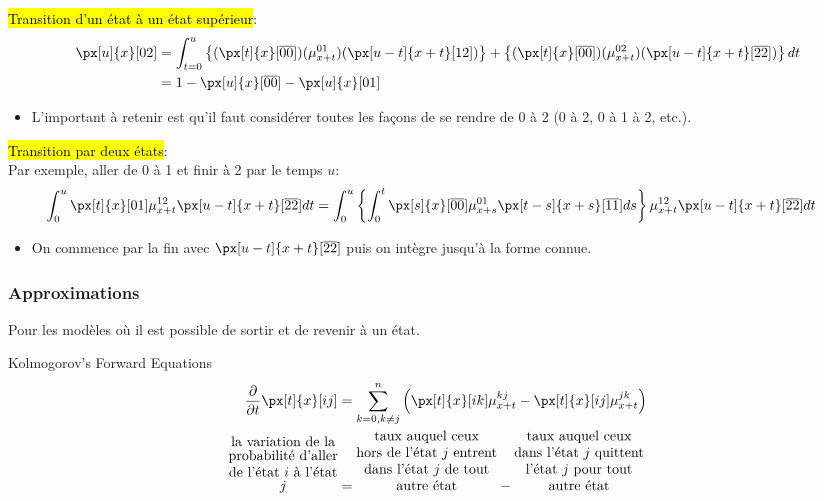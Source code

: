 \documentclass[10pt, french]{article}
\begin{document}
\begin{multicols*}{2}
\hl{Transition d'un état à un état supérieur}:
\begin{align*}
	\px[u]{x}[02] 
	&=	\int_{t = 0}^{u} \left\{(\px[t]{x}[\overline{00}]) (\mu_{x + t}^{01}) (\px[u - t]{x + t}[12])\right\} + \left\{(\px[t]{x}[\overline{00}]) (\mu_{x + t}^{02}) (\px[u - t]{x + t}[\overline{22}])\right\} dt	\\
	&=	1 - \px[u]{x}[\overline{00}] - \px[u]{x}[01]
\end{align*}
\begin{itemize}
	\item	L'important à retenir est qu'il faut considérer toutes les façons de se rendre de 0 à 2 (0 à 2, 0 à 1 à 2, etc.).
\end{itemize}

\hl{Transition par deux états}:\\
Par exemple, aller de 0 à 1 et finir à 2 par le temps $u$:
\begin{align*}
	\int_{0}^{u} \px[t]{x}[01] \mu_{x + t}^{12} \px[u - t]{x + t}[\overline{22}]dt
	&=	\int_{0}^{u} 
			\left\{
				\int_{0}^{t} \px[s]{x}[\overline{00}] \mu_{x + s}^{01} \px[t - s]{x + s}[\overline{11}]ds 
			\right\} 
			\mu_{x + t}^{12} \px[u - t]{x + t}[\overline{22}]dt
\end{align*}
\begin{itemize}
	\item	On commence par la fin avec $\px[u - t]{x + t}[\overline{22}]$ puis on intègre jusqu'à la forme connue.
\end{itemize}

\subsubsection*{Approximations}
Pour les modèles où il est possible de sortir et de revenir à un état.

\begin{conceptgen}{Kolmogorov's Forward Equations}
\begin{align*}
	\derivee{t}{} \px[t]{x}[ij]
	&=	\sumz{n}{k = 0, k \neq j} \left( \px[t]{x}[ik] \mu_{x + t}^{kj} - \px[t]{x}[ij] \mu_{x + t}^{jk}  \right)	\\
	\shortstack{la variation de la\\ probabilité d'aller\\ de l'état $i$ à l'état\\ $j$}
	&=	\shortstack{taux auquel ceux\\ hors de l'état $j$ entrent\\ dans l'état $j$ de tout\\ autre état}	-	\shortstack{taux auquel ceux\\ dans l'état $j$ quittent\\ l'état $j$ pour tout\\ autre état}
\end{align*}


\end{conceptgen}
\end{multicols*}
\end{document}
